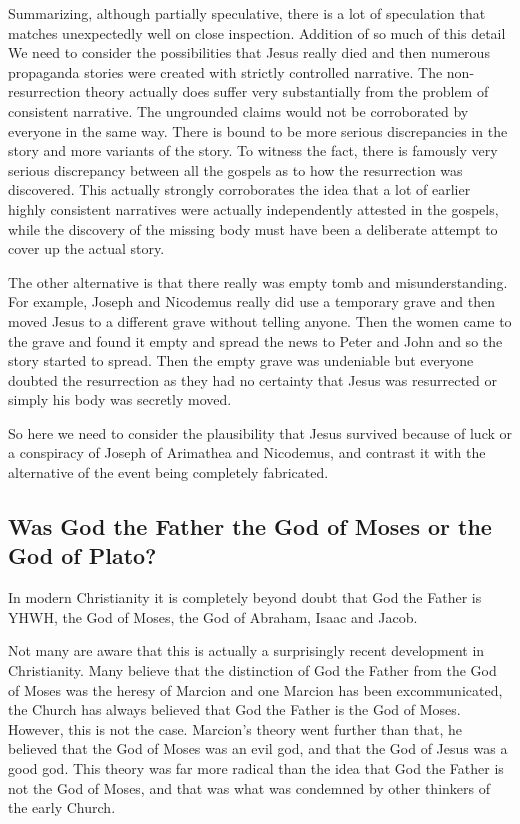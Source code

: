 Summarizing, although partially speculative, there is a lot of speculation that matches unexpectedly well on close inspection.
Addition of so much of this detail We need to consider the possibilities that Jesus really died and then numerous propaganda stories were created with strictly controlled narrative.
The non-resurrection theory actually does suffer very substantially from the problem of consistent narrative.
The ungrounded claims would not be corroborated by everyone in the same way.
There is bound to be more serious discrepancies in the story and more variants of the story.
To witness the fact, there is famously very serious discrepancy between all the gospels as to how the resurrection was discovered.
This actually strongly corroborates the idea that a lot of earlier highly consistent narratives were actually independently attested in the gospels, while the discovery of the missing body must have been a deliberate attempt to cover up the actual story.

The other alternative is that there really was empty tomb and misunderstanding.
For example, Joseph and Nicodemus really did use a temporary grave and then moved Jesus to a different grave without telling anyone.
Then the women came to the grave and found it empty and spread the news to Peter and John and so the story started to spread.
Then the empty grave was undeniable but everyone doubted the resurrection as they had no certainty that Jesus was resurrected or simply his body was secretly moved.

So here we need to consider the plausibility that Jesus survived because of luck or a conspiracy of Joseph of Arimathea and Nicodemus, and contrast it with the alternative of the event being completely fabricated.

\subsection{Was God the Father the God of Moses or the God of Plato?}\label{subsec:was-god-the-father-the-god-of-moses-or-the-god-of-plato}

In modern Christianity it is completely beyond doubt that God the Father is YHWH, the God of Moses, the God of Abraham, Isaac and Jacob.

Not many are aware that this is actually a surprisingly recent development in Christianity.
Many believe that the distinction of God the Father from the God of Moses was the heresy of Marcion and one Marcion has been excommunicated, the Church has always believed that God the Father is the God of Moses.
However, this is not the case.
Marcion's theory went further than that, he believed that the God of Moses was an evil god, and that the God of Jesus was a good god.
This theory was far more radical than the idea that God the Father is not the God of Moses, and that was what was condemned by other thinkers of the early Church.


